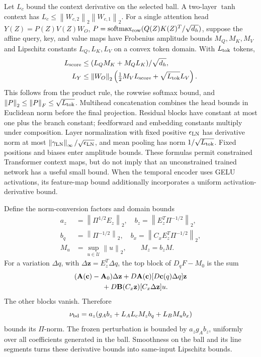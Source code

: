 \documentclass[journal]{IEEEtran}
\theoremstyle{plain}
\theoremstyle{definition}
\newcommand{\vz}{\mathbf{z}}
\newcommand{\vc}{\mathbf{c}}
\newcommand{\mA}{\mathbf{A}}
\newcommand{\mB}{\mathbf{B}}
\newcommand{\norm}[1]{\left\lVert #1\right\rVert}
\begin{document}
Let $L_c$ bound the context derivative on the selected ball. A two-layer $\tanh$ context has $L_c\le\norm{W_{c,2}}_2\norm{W_{c,1}}_2$. For a single attention head $Y(Z)=P(Z)V(Z)W_O$, $P=\operatorname{softmax}_{\rm row}(Q(Z)K(Z)^T/\sqrt{d_h})$, suppose the affine query, key, and value maps have Frobenius amplitude bounds $M_Q,M_K,M_V$ and Lipschitz constants $L_Q,L_K,L_V$ on a convex token domain. With $L_{\rm tok}$ tokens,
\begin{equation}
\begin{split}
L_{\rm score}&\le(L_QM_K+M_QL_K)/\sqrt{d_h},\\
L_Y&\le\norm{W_O}_2\left(\tfrac12M_VL_{\rm score}
+\sqrt{L_{\rm tok}}L_V\right).
\end{split}
\label{eq:attention_bound}
\end{equation}
This follows from the product rule, the rowwise softmax bound, and $\norm{P}_2\le\norm{P}_F\le\sqrt{L_{\rm tok}}$. Multihead concatenation combines the head bounds in Euclidean norm before the final projection. Residual blocks have constant at most one plus the branch constant; feedforward and embedding constants multiply under composition. Layer normalization with fixed positive $\epsilon_{\rm LN}$ has derivative norm at most $\norm{\gamma_{\rm LN}}_\infty/\sqrt{\epsilon_{\rm LN}}$, and mean pooling has norm $1/\sqrt{L_{\rm tok}}$. Fixed positions and biases enter amplitude bounds. These formulas permit constrained Transformer context maps, but do not imply that an unconstrained trained network has a useful small bound. When the temporal encoder uses GELU activations, its feature-map bound additionally incorporates a uniform activation-derivative bound.

Define the norm-conversion factors and domain bounds
\begin{equation}
\begin{split}
a_z&=\norm{\Pi^{1/2}E_z}_2,\quad
b_z=\norm{E_z^T\Pi^{-1/2}}_2,\\
b_q&=\norm{\Pi^{-1/2}}_2,\quad
b_x=\norm{C_xE_z^T\Pi^{-1/2}}_2,\\
M_u&=\sup_{u\in\mathcal U}\norm{u}_2,\qquad M_z=b_zM.
\end{split}
\label{eq:norm_conversion}
\end{equation}
For a variation $\Delta q$, with $\Delta\vz=E_z^T\Delta q$, the top block of $D_qF-M_0$ is the sum
\begin{equation}
\begin{split}
&(\mA(\vc)-\mA_0)\Delta\vz
+D\mA(\vc)[D\vc(q)\Delta q]\vz\\
&\hspace{14mm}+D\mB(C_x\vz)[C_x\Delta\vz]u.
\end{split}
\label{eq:full_derivative}
\end{equation}
The other blocks vanish. Therefore
\begin{equation}
\nu_{\rm bd}=a_z(g_A b_z+L_A L_cM_zb_q+L_BM_ub_x)
\label{eq:derivative_budget}
\end{equation}
bounds its $\Pi$-norm. The frozen perturbation is bounded by $a_zg_A b_z$, uniformly over all coefficients generated in the ball. Smoothness on the ball and its line segments turns these derivative bounds into same-input Lipschitz bounds.
\end{document}
